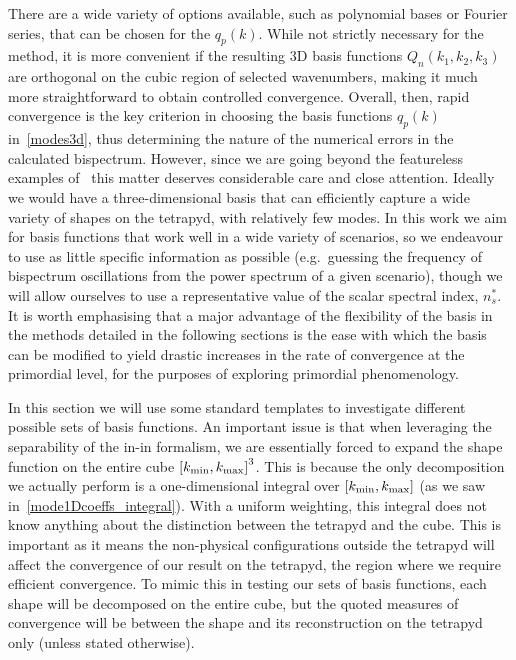 There are a wide variety of options available, such as polynomial bases
or Fourier series, that can be chosen for the $q_p(k)$.
While not strictly necessary for the method, it is more convenient if 
the resulting 3D basis functions $Q_n(k_1,k_2,k_3)$
are orthogonal on the cubic region of selected wavenumbers, making it much more straightforward to obtain controlled convergence. Overall, then, rapid convergence is the key criterion in choosing the basis functions $q_p(k)$ in~\eqref{modes3d}, thus determining the nature of the numerical errors in the calculated bispectrum.
However, since we are going beyond the featureless examples of~\cite{Funakoshi}
this matter deserves considerable care and close attention.
Ideally we would have a three-dimensional basis that can efficiently
capture a wide variety of shapes on the tetrapyd, with relatively few modes.
In this work we aim for basis functions that work well in a wide variety of scenarios,
so we endeavour to use as little specific information as possible
(e.g.\ guessing the frequency of bispectrum oscillations from
the power spectrum of a given scenario), though we
will allow ourselves to use a representative value
of the scalar spectral index, $n_s^{*}$.   It is worth emphasising that a major advantage of the flexibility of the basis
in the methods detailed in the following sections is the ease with which
the basis can be modified to yield drastic increases in 
the rate of convergence at the primordial level, for the purposes of
exploring primordial phenomenology.


In this section we will use some standard templates to investigate different possible sets of basis functions.
An important issue is that when leveraging the separability of the in-in formalism,
we are essentially forced to expand the shape function on the entire cube ${[{k_\text{min}},{k_\text{max}}]}^3$.
This is because the only decomposition we actually perform is
a one-dimensional integral over $[{k_\text{min}},{k_\text{max}}]$
(as we saw in~\eqref{mode1Dcoeffs_integral}).
With a uniform weighting, this integral does not know anything about the 
distinction between the tetrapyd and the cube.
This is important as it means the non-physical configurations outside the tetrapyd will affect the convergence of our result on the tetrapyd, the region where we require efficient convergence.
To mimic this in testing our sets of basis functions, each shape will be decomposed on the
entire cube, but the quoted measures of convergence will be between the shape
and its reconstruction on the tetrapyd only (unless stated otherwise).

